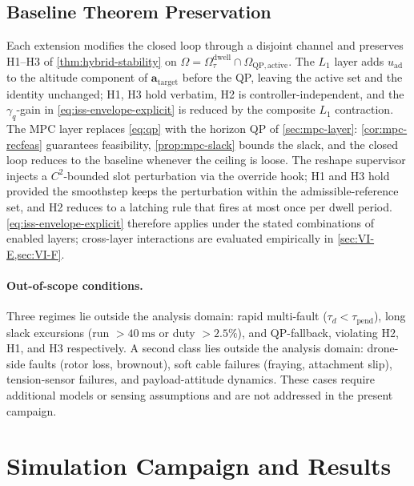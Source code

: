 \documentclass[lettersize,journal]{IEEEtran}
\newcommand{\vect}[1]{\boldsymbol{#1}}
\begin{document}
\subsection{Baseline Theorem Preservation}
\label{sec:theorem-preservation}

Each extension modifies the closed loop through a disjoint channel and preserves H1--H3 of \cref{thm:hybrid-stability} on $\Omega = \Omega_\tau^{\mathrm{dwell}}\cap\Omega_{\mathrm{QP,active}}$. The $L_1$ layer adds $u_{\mathrm{ad}}$ to the altitude component of $\vect a_{\mathrm{target}}$ before the QP, leaving the active set and the identity unchanged; H1, H3 hold verbatim, H2 is controller-independent, and the $\gamma_q$-gain in \eqref{eq:iss-envelope-explicit} is reduced by the composite $L_1$ contraction. The MPC layer replaces \eqref{eq:qp} with the horizon QP of \cref{sec:mpc-layer}: \cref{cor:mpc-recfeas} guarantees feasibility, \cref{prop:mpc-slack} bounds the slack, and the closed loop reduces to the baseline whenever the ceiling is loose. The reshape supervisor injects a $C^2$-bounded slot perturbation via the override hook; H1 and H3 hold provided the smoothstep keeps the perturbation within the admissible-reference set, and H2 reduces to a latching rule that fires at most once per dwell period. \eqref{eq:iss-envelope-explicit} therefore applies under the stated combinations of enabled layers; cross-layer interactions are evaluated empirically in \cref{sec:VI-E,sec:VI-F}.

\paragraph{Out-of-scope conditions.} Three regimes lie outside the analysis domain: rapid multi-fault ($\tau_d<\tau_{\mathrm{pend}}$), long slack excursions (run $>\SI{40}{\milli\second}$ or duty $>2.5\%$), and QP-fallback, violating H2, H1, and H3 respectively. A second class lies outside the analysis domain: drone-side faults (rotor loss, brownout), soft cable failures (fraying, attachment slip), tension-sensor failures, and payload-attitude dynamics. These cases require additional models or sensing assumptions and are not addressed in the present campaign.


\section{Simulation Campaign and Results}
\label{sec:simulation}
\end{document}
